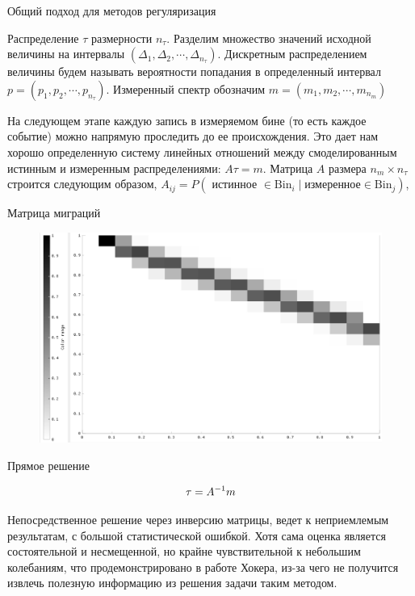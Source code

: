 \documentclass[fullscreen=true,russian,compress,%
	hyperref={unicode,bookmarks=false}]{presentation}
\begin{document}
\begin{frame}{Общий подход для методов регуляризация}

\begin{block}{}
   Распределение $\tau$ размерности $n_{\tau}$. Разделим множество значений исходной величины на интервалы 
   $(\Delta_{1}, \Delta_{2}, \cdots ,\Delta_{n_{\tau}})$. Дискретным распределением величины будем называть вероятности попадания 
   в определенный интервал $p = (p_{1}, p_{2}, \cdots, p_{n_{\tau}})$. Измеренный спектр обозначим $m = (m_{1}, m_{2}, \cdots, m_{n_{m}})$
\end{block}

\begin{block}{}
   На следующем этапе каждую запись в измеряемом бине (то есть каждое событие) можно напрямую проследить до ее происхождения. 
   Это дает нам хорошо определенную систему линейных отношений между смоделированным истинным и измеренным распределениями: 
   $A\tau = m$. Матрица $A$ размера $n_{m} \times n_{\tau}$ строится следующим образом, 
   $A_{ij} = P( \text{ истинное } \in \text{Bin}_{i} \mid \text{измеренное} \in \text{Bin}_{j} )$, 
\end{block}
  
\end{frame}

\begin{frame}{Матрица миграций}
\begin{figure}[!ht]
   \includegraphics[width=\linewidth]{images/gaus_mig_black.png}
\end{figure}
\end{frame}


\begin{frame}{Прямое решение}
\begin{block}{}
   \begin{equation}
      \large
      \tau = A^{-1} m
   \end{equation}
\end{block}
\begin{block}{}
   Непосредственное решение через инверсию матрицы, ведет к неприемлемым результатам, с большой статистической
   ошибкой. Хотя сама оценка является состоятельной и несмещенной, но крайне чувствительной к небольшим колебаниям, 
   что продемонстрировано в работе Хокера, из-за чего не получится извлечь полезную информацию из решения задачи таким методом.
\end{block}
\end{frame}
\end{document}
